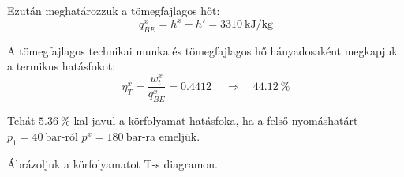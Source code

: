 \noindent Ezután meghatározzuk a tömegfajlagos hőt:
\begin{equation}
q_{BE}^x = h^x - h' = \SI{3310}{\kilo\joule\per\kilogram}
\end{equation}

\noindent A tömegfajlagos technikai munka és tömegfajlagos hő hányadosaként megkapjuk a termikus hatásfokot:
\begin{equation}
\eta_{T}^x = \dfrac{w_t^x}{q_{BE}^x} = \SI{0,4412}{}
\quad 
\Rightarrow
\quad 
\SI{44,12}{\percent}
\end{equation}

\noindent Tehát $\SI{5,36}{\percent}$-kal javul a körfolyamat hatásfoka, ha a felső nyomáshatárt $p_1 = \SI{40}{\bar}$-ról $p^x = \SI{180}{\bar}$-ra emeljük.

\vspace{0.2cm}
\noindent Ábrázoljuk a körfolyamatot T-s diagramon.

